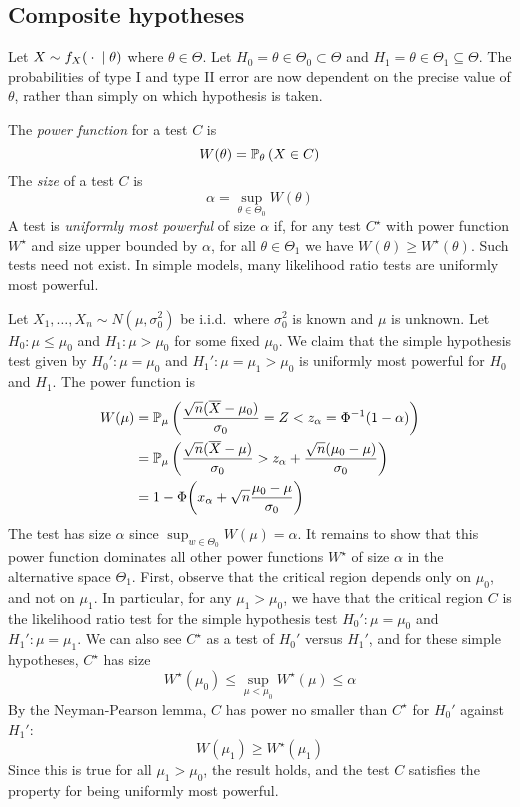\subsection{Composite hypotheses}
Let \( X \sim f_X({}\cdot{} \mid \theta) \) where \( \theta \in \Theta \).
Let \( H_0 = \theta \in \Theta_0 \subset \Theta \) and \( H_1 = \theta \in \Theta_1 \subseteq \Theta \).
The probabilities of type I and type II error are now dependent on the precise value of \( \theta \), rather than simply on which hypothesis is taken.
\begin{definition}
	The \textit{power function} for a test \( C \) is
	\[ W(\theta) = \mathbb{P}_{\theta}\left({X \in C}\right) \]
	The \textit{size} of a test \( C \) is
	\[ \alpha = \sup_{\theta \in \Theta_0} W(\theta) \]
	A test is \textit{uniformly most powerful} of size \( \alpha \) if, for any test \( C^\star \) with power function \( W^\star \) and size upper bounded by \( \alpha \), for all \( \theta \in \Theta_1 \) we have \( W(\theta) \geq W^\star(\theta) \).
	Such tests need not exist.
	In simple models, many likelihood ratio tests are uniformly most powerful.
\end{definition}
\begin{example}
	Let \( X_1, \dots, X_n \sim N(\mu, \sigma_0^2) \) be i.i.d.\ where \( \sigma_0^2 \) is known and \( \mu \) is unknown.
	Let \( H_0 \colon \mu \leq \mu_0 \) and \( H_1 \colon \mu > \mu_0 \) for some fixed \( \mu_0 \).
	We claim that the simple hypothesis test given by \( H_0' \colon \mu = \mu_0 \) and \( H_1' \colon \mu = \mu_1 > \mu_0 \) is uniformly most powerful for \( H_0 \) and \( H_1 \).
	The power function is
	\begin{align*}
		W(\mu) &= \mathbb{P}_{\mu}\left({\frac{\sqrt{n}(\overline X-\mu_0)}{\sigma_0} = Z < z_\alpha = \Phi^{-1}(1-\alpha)}\right) \\
		&= \mathbb{P}_{\mu}\left({\frac{\sqrt{n}(\overline X - \mu)}{\sigma_0} > z_\alpha + \frac{\sqrt{n}(\mu_0 - \mu)}{\sigma_0}}\right) \\
		&= 1 - \Phi\qty(x_\alpha + \sqrt{n} \frac{\mu_0 - \mu}{\sigma_0})
	\end{align*}
	The test has size \( \alpha \) since \( \sup_{w \in \Theta_0} W(\mu) = \alpha \).
	It remains to show that this power function dominates all other power functions \( W^\star \) of size \( \alpha \) in the alternative space \( \Theta_1 \).
	First, observe that the critical region depends only on \( \mu_0 \), and not on \( \mu_1 \).
	In particular, for any \( \mu_1 > \mu_0 \), we have that the critical region \( C \) is the likelihood ratio test for the simple hypothesis test \( H_0' \colon \mu = \mu_0 \) and \( H_1' \colon \mu = \mu_1 \).
	We can also see \( C^\star \) as a test of \( H_0' \) versus \( H_1' \), and for these simple hypotheses, \( C^\star \) has size
	\[ W^\star(\mu_0) \leq \sup_{\mu < \mu_0} W^\star(\mu) \leq \alpha \]
	By the Neyman-Pearson lemma, \( C \) has power no smaller than \( C^\star \) for \( H_0' \) against \( H_1' \):
	\[ W(\mu_1) \geq W^\star(\mu_1) \]
	Since this is true for all \( \mu_1 > \mu_0 \), the result holds, and the test \( C \) satisfies the property for being uniformly most powerful.
\end{example}

